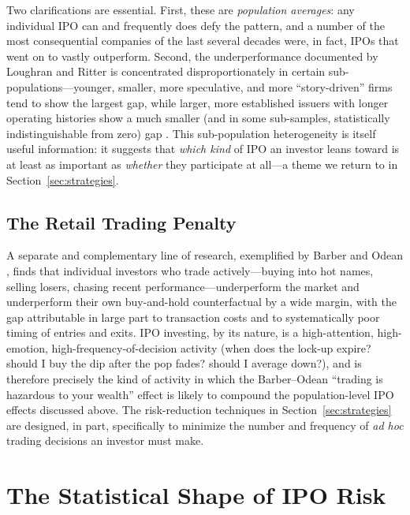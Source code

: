 \documentclass[conference]{IEEEtran}
\begin{document}
Two clarifications are essential. First, these are \emph{population averages}: any individual IPO can and frequently does defy the pattern, and a number of the most consequential companies of the last several decades were, in fact, IPOs that went on to vastly outperform. Second, the underperformance documented by Loughran and Ritter is concentrated disproportionately in certain sub-populations---younger, smaller, more speculative, and more ``story-driven'' firms tend to show the largest gap, while larger, more established issuers with longer operating histories show a much smaller (and in some sub-samples, statistically indistinguishable from zero) gap \cite{loughranritter2004}. This sub-population heterogeneity is itself useful information: it suggests that \emph{which kind} of IPO an investor leans toward is at least as important as \emph{whether} they participate at all---a theme we return to in Section~\ref{sec:strategies}.

\subsection{The Retail Trading Penalty}

A separate and complementary line of research, exemplified by Barber and Odean \cite{barberodean2000}, finds that individual investors who trade actively---buying into hot names, selling losers, chasing recent performance---underperform the market and underperform their own buy-and-hold counterfactual by a wide margin, with the gap attributable in large part to transaction costs and to systematically poor timing of entries and exits. IPO investing, by its nature, is a high-attention, high-emotion, high-frequency-of-decision activity (when does the lock-up expire? should I buy the dip after the pop fades? should I average down?), and is therefore precisely the kind of activity in which the Barber--Odean ``trading is hazardous to your wealth'' effect is likely to compound the population-level IPO effects discussed above. The risk-reduction techniques in Section~\ref{sec:strategies} are designed, in part, specifically to minimize the number and frequency of \emph{ad hoc} trading decisions an investor must make.

\section{The Statistical Shape of IPO Risk}
\label{sec:risk}
\end{document}
